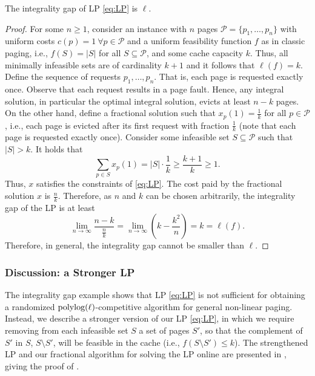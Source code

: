 \documentclass[11pt]{article}
\newcommand{\cP}{{\mathcal{P}}}
\begin{document}
\begin{lemma}
    \label{lem:integralityGap}
    The integrality gap of \textnormal{LP} \eqref{eq:LP} is $\ell$. 
\end{lemma}
\begin{proof}
For some $n \geq 1$, consider an instance with $n$ pages $\cP = \{p_1,\ldots, p_n\}$ with uniform costs $c(p) = 1~\forall p \in \cP$ and a uniform feasibility function $f$ as in classic paging, i.e.,  $f(S) = |S|$ for all $S \subseteq \cP$, and some cache capacity $k$. Thus, all minimally infeasible sets are of cardinality $k+1$ and it follows that $\ell(f) = k$. Define the sequence of requests $p_1,\ldots, p_n$. That is, each page is requested exactly once. Observe that each request results in a page fault. Hence, any integral solution, in particular the optimal integral solution, evicts at least $n-k$ pages. On the other hand, define a fractional solution such that $x_p(1) = \frac{1}{k}$ for all $p \in \cP$, i.e., each page is evicted after its first request with fraction $\frac{1}{k}$ (note that each page is requested exactly once). Consider some infeasible set $S \subseteq \cP$ such that $|S| > k$. It holds that 
$$\sum_{p \in S} x_p(1) = |S| \cdot \frac{1}{k} \geq \frac{k+1}{k} \geq 1.$$
Thus, $x$ satisfies the constraints of \eqref{eq:LP}. The cost paid by the fractional solution $x$ is $\frac{n}{k}$. Therefore, as $n$ and $k$ can be chosen arbitrarily, the integrality gap of the LP is at least $$\lim_{n \rightarrow \infty} \frac{n-k}{\frac{n}{k}} = \lim_{n \rightarrow \infty} \left(k-\frac{k^2}{n}\right) = k = \ell(f).$$
    Therefore, in general, the integrality gap cannot be smaller than $\ell$.  
\end{proof}

\subsubsection{Discussion: a Stronger LP}
The integrality gap example shows that LP \eqref{eq:LP} is not sufficient for obtaining a randomized $\textnormal{polylog}(\ell)$-competitive algorithm for general non-linear paging. Instead, we describe a stronger version of our LP \eqref{eq:LP}, %
in which we require removing from each infeasible set $S$ a set of pages $S'$, so that the complement of $S'$ in $S$, $S \setminus S'$, will be feasible in the cache (i.e., $ f\left(S \setminus S'\right) \leq k$). The strengthened LP and our fractional algorithm for solving the LP online are presented in , giving the proof of . 
\end{document}
